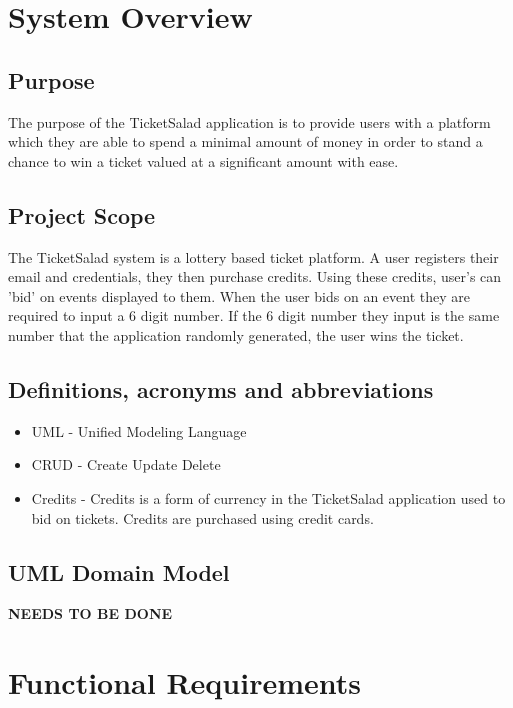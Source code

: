 \documentclass[11pt]{article}
\begin{document}
	\section{System Overview}
	\subsection{Purpose}
	The purpose of the TicketSalad application is to provide users with a platform which they are able to spend a minimal amount of money in order to stand a chance to win a ticket valued at a significant amount with ease.
	\subsection{Project Scope}
	The TicketSalad system is a lottery based ticket platform. A user registers their email and credentials, they then purchase credits. Using these credits, user's can 'bid' on events displayed to them. When the user bids on an event they are required to input a 6 digit number. If the 6 digit number they input is the same number that the application randomly generated, the user wins the ticket.
	\subsection{Definitions, acronyms and abbreviations}
	\begin{itemize}
		\item UML - Unified Modeling Language 
		\item CRUD - Create Update Delete
		\item Credits - Credits is a form of currency in the TicketSalad application used to bid on tickets. Credits are purchased using credit cards.
	\end{itemize}
	
	\subsection{UML Domain Model}
	\textbf{NEEDS TO BE DONE}
	\section{Functional Requirements}
\end{document}
